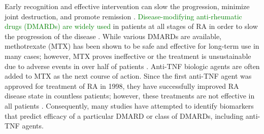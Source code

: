 Early recognition and effective intervention can slow the progression, minimize joint destruction, and promote remission \cite{finckh_long-term_2006}. \textcolor{green}{Disease-modifying anti-rheumatic drugs (DMARDs) are widely used} in patients at all stages of RA in order to slow the progression of the disease \cite{singh_2012_2012,smolen_eular_2014,smolen_eular_2010}. While various DMARDs are available, methotrexate (MTX) has been shown to be safe and effective for long-term use in many cases; however, MTX proves ineffective or the treatment is unsustainable due to adverse events in over half of patients \cite{pincus_methotrexate_2003,pincus_update_2013,smolen_treating_2015,odell_therapies_2013,goekoop-ruiterman_clinical_2005,moreland_randomized_2012}. Anti-TNF biologic agents are often added to MTX as the next course of action. Since the first anti-TNF agent was approved for treatment of RA in 1998, they have successfully improved RA disease state in countless patients; however, these treatments are not effective in all patients \cite{firestein_evolving_2003}. Consequently, many studies have attempted to identify biomarkers that predict efficacy of a particular DMARD or class of DMARDs, including anti-TNF agents.

